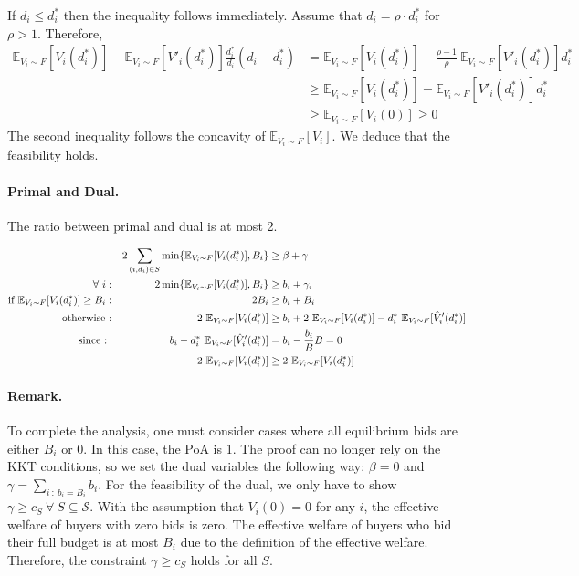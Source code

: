 If $d_{i} \leq d^{*}_{i}$ then the inequality follows immediately. Assume that $d_{i} = \rho \cdot d^{*}_{i}$ for $\rho > 1$.
Therefore,
\begin{align*}
	\mathbb{E}_{V_i \sim F}[V_{i}(d^{*}_{i})]  - \mathbb{E}_{V_i \sim F}[V'_{i}(d^{*}_{i})] \frac{d^{*}_{i}}{d_{i}} (d_{i} - d^{*}_{i})
&= \mathbb{E}_{V_i \sim F}[V_{i}(d^{*}_{i})]  - \frac{\rho - 1}{\rho}\  \mathbb{E}_{V_i \sim F}[V'_{i}(d^{*}_{i})] d^{*}_{i} \\
%
&\geq \mathbb{E}_{V_i \sim F}[V_{i}(d^{*}_{i})]  - \mathbb{E}_{V_i \sim F}[V'_{i}(d^{*}_{i})] d^{*}_{i} \\
%
&\geq \mathbb{E}_{V_i \sim F}[V_{i}(0)] \geq 0
\end{align*}
The second inequality follows the concavity of $\mathbb{E}_{V_i \sim F}[V_{i}]$. We deduce that the feasibility holds.

\paragraph{Primal and Dual.}
The ratio between primal and dual is at most 2.

\begin{align*}
	&& 2\sum_{(i,d_{i}) \in S} \min\{\mathbb{E}_{V_i \sim F}[V_i(d_i^*)], B_i \} &\ge \beta + \gamma\\
	\forall\ i : && 2 \min\{\mathbb{E}_{V_i \sim F}[V_i(d_i^*)], B_i \} &\ge b_i + \gamma_i \\
	\textnormal{if } \mathbb{E}_{V_i \sim F}[V_i(d_i^*)] \ge B_i : && 2B_i &\ge b_i + B_i\\
	\textnormal{otherwise :} && 2 \ \mathbb{E}_{V_i \sim F}[V_i(d_i^*)] &\ge b_i + 2\ \mathbb{E}_{V_i \sim F}[V_{i}(d^{*}_{i})] - d^{*}_{i}\  \mathbb{E}_{V_i \sim F}[\hat{V}'_{i}(d^{*}_{i})]\\
	\textnormal{since : } && b_i - d^{*}_{i} \ \mathbb{E}_{V_i \sim F}[\hat{V}'_{i}(d^{*}_{i})] &= b_i - \frac{b_i}{B} B = 0\\
	&& 2\  \mathbb{E}_{V_i \sim F}[V_{i}(d^{*}_{i})] &\ge 2\  \mathbb{E}_{V_i \sim F}[V_{i}(d^{*}_{i})]
\end{align*}

\paragraph{Remark.} To complete the analysis, one must consider cases where all equilibrium bids are either $B_{i}$ or 0. In this case, the PoA is 1. The proof can no longer rely on the KKT conditions, so we set the dual variables the following way:
$\beta = 0$ and $\gamma = \sum_{i\ :\ b_i = B_i} b_i$. For the feasibility of the dual, we only have to show $\gamma \ge c_S \ \forall \ S \subseteq \mathcal{S}$. With the assumption that $V_i(0) = 0$ for any $i$, the effective welfare of buyers with zero bids is zero. The effective welfare of buyers who bid their full budget is at most $B_i$ due to the definition of the effective welfare. Therefore, the constraint $\gamma \ge c_S$ holds for all $S$.

